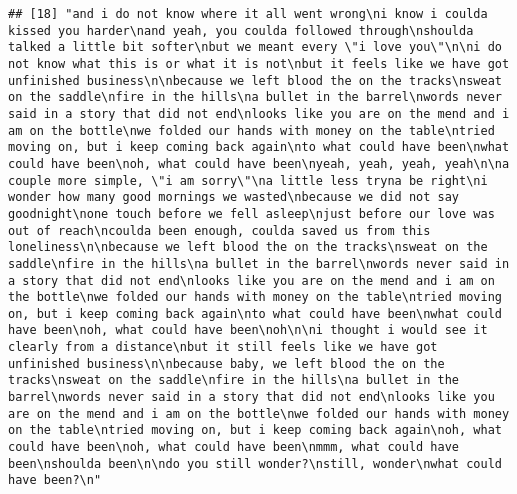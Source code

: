 \documentclass[]{article}
\begin{document}
\begin{verbatim}
## [18] "and i do not know where it all went wrong\ni know i coulda kissed you harder\nand yeah, you coulda followed through\nshoulda talked a little bit softer\nbut we meant every \"i love you\"\n\ni do not know what this is or what it is not\nbut it feels like we have got unfinished business\n\nbecause we left blood the on the tracks\nsweat on the saddle\nfire in the hills\na bullet in the barrel\nwords never said in a story that did not end\nlooks like you are on the mend and i am on the bottle\nwe folded our hands with money on the table\ntried moving on, but i keep coming back again\nto what could have been\nwhat could have been\noh, what could have been\nyeah, yeah, yeah, yeah\n\na couple more simple, \"i am sorry\"\na little less tryna be right\ni wonder how many good mornings we wasted\nbecause we did not say goodnight\none touch before we fell asleep\njust before our love was out of reach\ncoulda been enough, coulda saved us from this loneliness\n\nbecause we left blood the on the tracks\nsweat on the saddle\nfire in the hills\na bullet in the barrel\nwords never said in a story that did not end\nlooks like you are on the mend and i am on the bottle\nwe folded our hands with money on the table\ntried moving on, but i keep coming back again\nto what could have been\nwhat could have been\noh, what could have been\noh\n\ni thought i would see it clearly from a distance\nbut it still feels like we have got unfinished business\n\nbecause baby, we left blood the on the tracks\nsweat on the saddle\nfire in the hills\na bullet in the barrel\nwords never said in a story that did not end\nlooks like you are on the mend and i am on the bottle\nwe folded our hands with money on the table\ntried moving on, but i keep coming back again\noh, what could have been\noh, what could have been\nmmm, what could have been\nshoulda been\n\ndo you still wonder?\nstill, wonder\nwhat could have been?\n"                                                                                                                                                                                                                                                                                                                                                                                                                                                                                                                                                                                                                                                                                                                                                                                                                                                                                                                                                                                             

\end{verbatim}
\end{document}
